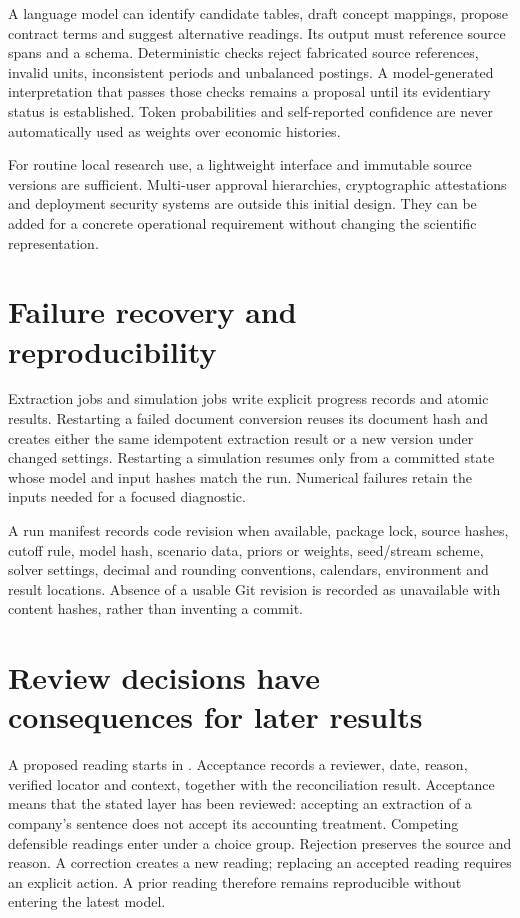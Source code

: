 A language model can identify candidate tables, draft concept mappings,
propose contract terms and suggest alternative readings. Its output must
reference source spans and a schema. Deterministic checks reject fabricated
source references, invalid units, inconsistent periods and unbalanced
postings. A model-generated interpretation that passes those checks remains
a proposal until its evidentiary status is established. Token probabilities
and self-reported confidence are never automatically used as weights over
economic histories.

For routine local research use, a lightweight interface and immutable source
versions are sufficient. Multi-user approval hierarchies, cryptographic
attestations and deployment security systems are outside this initial design.
They can be added for a concrete operational requirement without changing the
scientific representation.

\section{Failure recovery and reproducibility}

Extraction jobs and simulation jobs write explicit progress records and atomic
results. Restarting a failed document conversion reuses its document hash and
creates either the same idempotent extraction result or a new version under
changed settings. Restarting a simulation resumes only from a committed state
whose model and input hashes match the run. Numerical failures retain the
inputs needed for a focused diagnostic.

A run manifest records code revision when available, package lock, source
hashes, cutoff rule, model hash, scenario data, priors or weights, seed/stream
scheme, solver settings, decimal and rounding conventions, calendars,
environment and result locations. Absence of a usable Git revision is recorded
as unavailable with content hashes, rather than inventing a commit.

\section{Review decisions have consequences for later results}

A proposed reading starts in . Acceptance records a reviewer,
date, reason, verified locator and context, together with the reconciliation
result. Acceptance means that the stated layer has been reviewed: accepting
an extraction of a company's sentence does not accept its accounting
treatment. Competing defensible readings enter 
under a choice group. Rejection preserves the source and reason.
A correction creates a new reading; replacing an accepted reading requires
an explicit  action. A prior reading therefore remains
reproducible without entering the latest model.


